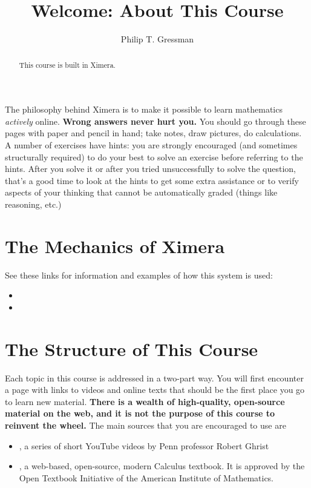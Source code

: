 \documentclass{ximera}
\title{Welcome: About This Course}
\author{Philip T. Gressman}
\begin{document}
\begin{abstract}
  This course is built in Ximera.
\end{abstract}\maketitle

The philosophy behind Ximera is to make it possible to learn mathematics \textit{actively} online. \textbf{Wrong answers never hurt you.} You should go through these pages with paper and pencil in hand; take notes, draw pictures, do calculations. A number of exercises have hints: you are strongly encouraged (and sometimes structurally required) to do your best to solve an exercise before referring to the hints. After you solve it or after you tried unsuccessfully to solve the question, that's a good time to look at the hints to get some extra assistance or to verify aspects of your thinking that cannot be automatically graded (things like reasoning, etc.)

\section*{The Mechanics of Ximera}

See these links for information and examples of how this system is used:
 \begin{itemize}
 \item {}
 \item {}
 \end{itemize}
  
  
 \section*{The Structure of This Course}
 
 Each topic in this course is addressed in a two-part way. You will first encounter a page with links to videos and online texts that should be the first place you go to learn new material. \textbf{There is a wealth of high-quality, open-source material on the web, and it is not the purpose of this course to reinvent the wheel.} The main sources that you are encouraged to use are
 
 \begin{itemize}
 \item {}, a series of short YouTube videos by Penn professor Robert Ghrist
 \item {}, a web-based, open-source, modern Calculus textbook. It is approved by the Open Textbook Initiative of the American Institute of Mathematics.
 \end{itemize}
 
\end{document}
